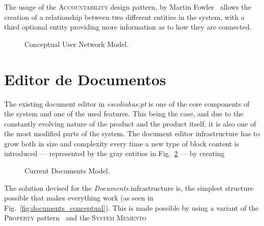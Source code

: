 \documentclass[9pt,a4paper]{extarticle}
\begin{document}
\begin{multicols}{2}
The usage of the \textsc{Accountability} design pattern, by Martin Fowler~\cite{fowler_accountability} allows the creation of a relationship between two different entities in the system, with a third optional entity providing more information as to how they are connected.

\begin{figure}[H]
  \caption{Conceptual User Network Model.}
  \label{fig:social_network_conceptual}
\end{figure}

\section{Editor de Documentos}\label{sec:document_editor}

The existing document editor in \emph{escolinhas.pt} is one of the core components of the system and one of the used features. This being the case, and due to the constantly evolving nature of the product and the product itself, it is also one of the most modified parts of the system. The document editor infrastructure has to grow both in size and complexity every time a new type of block content is introduced --- represented by the gray entities in Fig.~\ref{fig:documents_current} --- by creating 

\begin{figure}[H]
  \caption{Current Documents Model.}
  \label{fig:documents_current}
\end{figure}

The solution devised for the \emph{Documents} infrastructure is, the simplest structure possible that makes everything work (as seen in Fig.~\ref{fig:documents_conceptual}). This is made possible by using a variant of the \textsc{Property} pattern~\cite{metadata_and_active_object_models} and the \textsc{System Memento}~\cite{patterns_data_and_metadata_evolution_in_aoms}


\end{multicols}
\end{document}

